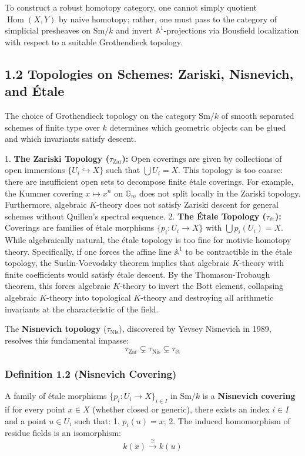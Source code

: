 \documentclass[11pt,twoside,openright]{amsbook}
\begin{document}
{To construct a robust homotopy category, one cannot simply quotient $\operatorname{Hom}(X, Y)$ by naive homotopy; rather, one must pass to the category of simplicial presheaves on $\mathrm{Sm}/k$ and invert $\mathbb{A}^1$-projections via Bousfield localization with respect to a suitable Grothendieck topology.

\subsection{1.2 Topologies on Schemes: Zariski, Nisnevich, and Étale}
The choice of Grothendieck topology on the category $\mathrm{Sm}/k$ of smooth separated schemes of finite type over $k$ determines which geometric objects can be glued and which invariants satisfy descent.

1. \textbf{The Zariski Topology ($\tau_{\mathrm{Zar}}$):} Open coverings are given by collections of open immersions $\{U_i \hookrightarrow X\}$ such that $\bigcup U_i = X$. This topology is too coarse: there are insufficient open sets to decompose finite étale coverings. For example, the Kummer covering $x \mapsto x^n$ on $\mathbb{G}_m$ does not split locally in the Zariski topology. Furthermore, algebraic $K$-theory does not satisfy Zariski descent for general schemes without Quillen's spectral sequence.
2. \textbf{The Étale Topology ($\tau_{\text{ét}}$):} Coverings are families of étale morphisms $\{p_i: U_i \to X\}$ with $\bigcup p_i(U_i) = X$. While algebraically natural, the étale topology is too fine for motivic homotopy theory. Specifically, if one forces the affine line $\mathbb{A}^1$ to be contractible in the étale topology, the Suslin-Voevodsky theorem implies that algebraic $K$-theory with finite coefficients would satisfy étale descent. By the Thomason-Trobaugh theorem, this forces algebraic $K$-theory to invert the Bott element, collapsing algebraic $K$-theory into topological $K$-theory and destroying all arithmetic invariants at the characteristic of the field.

The \textbf{Nisnevich topology} ($\tau_{\mathrm{Nis}}$), discovered by Yevsey Nisnevich in 1989, resolves this fundamental impasse:
$$\tau_{\mathrm{Zar}} \subsetneq \tau_{\mathrm{Nis}} \subsetneq \tau_{\text{ét}}$$

\subsubsection{Definition 1.2 (Nisnevich Covering)}
A family of étale morphisms $\{p_i: U_i \to X\}_{i \in I}$ in $\mathrm{Sm}/k$ is a \textbf{Nisnevich covering} if for every point $x \in X$ (whether closed or generic), there exists an index $i \in I$ and a point $u \in U_i$ such that:
1. $p_i(u) = x$;
2. The induced homomorphism of residue fields is an isomorphism:
$$k(x) \overset{\cong}{\longrightarrow} k(u)$$

}
\end{document}
